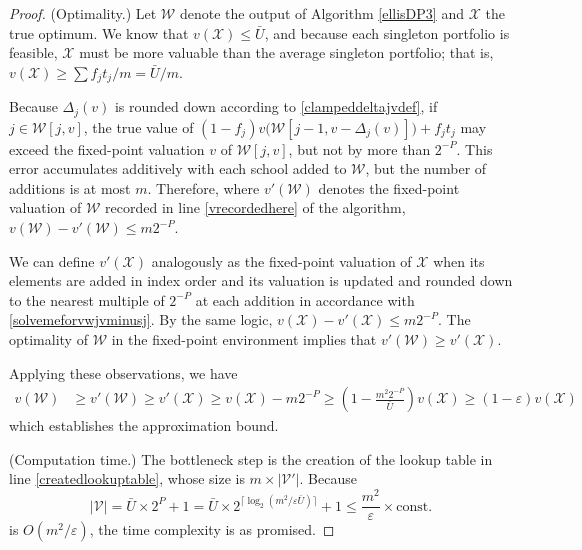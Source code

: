 \begin{proof}
(Optimality.) Let $\mathcal{W}$ denote the output of Algorithm \ref{ellisDP3} and $\mathcal{X}$ the true optimum. We know that $v(\mathcal{X}) \leq \bar U$, and because each singleton portfolio is feasible, $\mathcal{X}$ must be more valuable than the average singleton portfolio; that is, $v(\mathcal{X}) \geq \sum f_j t_j / m = \bar U / m$.

Because $\Delta_j(v)$ is rounded down according to \eqref{clampeddeltajvdef}, if $j \in \mathcal{W}[j, v]$, the true value of $(1 - f_j) v\bigl(\mathcal{W}[j-1, v- \Delta_j(v)]\bigr) + f_j t_j$ may exceed the fixed-point valuation $v$ of $\mathcal{W}[j, v]$, but not by more than $2^{-P}$. This error accumulates additively with each school added to $\mathcal{W}$, but the number of additions is at most $m$. Therefore, where $v'(\mathcal{W})$ denotes the fixed-point valuation of $\mathcal{W}$ recorded in line \ref{vrecordedhere} of the algorithm, 
$v(\mathcal{W}) - v'(\mathcal{W}) \leq m 2^{-P}$.

We can define $v'(\mathcal{X})$ analogously as the fixed-point valuation of $\mathcal{X}$ when its elements are added in index order and its valuation is updated and rounded down to the nearest multiple of $2^{-P}$ at each addition in accordance with \eqref{solvemeforvwjvminusj}. By the same logic, 
$v(\mathcal{X}) - v'(\mathcal{X}) \leq m 2^{-P}$. The optimality of $\mathcal{W}$ in the fixed-point environment implies that $v'(\mathcal{W}) \geq v'(\mathcal{X})$. 

Applying these observations, we have
\begin{equation}
\begin{split}
v(\mathcal{W}) &\geq v'(\mathcal{W}) \geq v'(\mathcal{X})
\geq v(\mathcal{X}) - m 2^{-P}
\geq \left(1 - \frac{m^2 2^{-P}}{\bar U}\right) v(\mathcal{X})
\geq \left(1 - \varepsilon\right) v(\mathcal{X})
\end{split}
\end{equation}
which establishes the approximation bound. 

(Computation time.) The bottleneck step is the creation of the lookup table in line \ref{createdlookuptable}, whose size is $m \times |\mathcal{V}'|$. Because
\begin{equation}
|\mathcal{V}| = \bar U \times 2^{P} + 1 = \bar U \times 2^ { \bigl\lceil\log_{2}\left(m ^2/ \varepsilon \bar U\right)\bigr\rceil} + 1
\leq\frac{m^2}{\varepsilon} \times \text{const.}
\end{equation}
is $O(m^2/ \varepsilon)$, the time complexity is as promised.
\end{proof}

